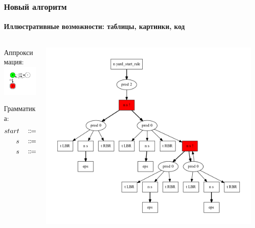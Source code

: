 \documentclass
  [aspectratio=1610] %
  {beamer}
\begin{document}
\begin{frame}%
    \frametitle{Новый алгоритм}
    \framesubtitle{Иллюстративные возможности: таблицы, картинки, код}
\begin{columns}[T]
  \begin{column}[t]{.4\textwidth}
     \begin{minipage}{2in} \CodeExample         \end{minipage}
     Аппроксимация:\\
          \includegraphics[width=2.5cm]{figures/in3.pdf}

          Грамматика:
          {\begin{align*}
          start& & &\Coloneq & &s \\
          s & & &\Coloneq & &\mbox{\texttt{LBR }} s \mbox{\texttt{ RBR }} s \\
          s & & &\Coloneq & &\varepsilon
          \end{align*}}
  \end{column}
  \begin{column}[T]{.6\textwidth}
  \vspace{-2em}
  \includegraphics[width=1\textwidth]{figures/out3.pdf}
  \end{column}
\end{columns}
\end{frame}
\end{document}

